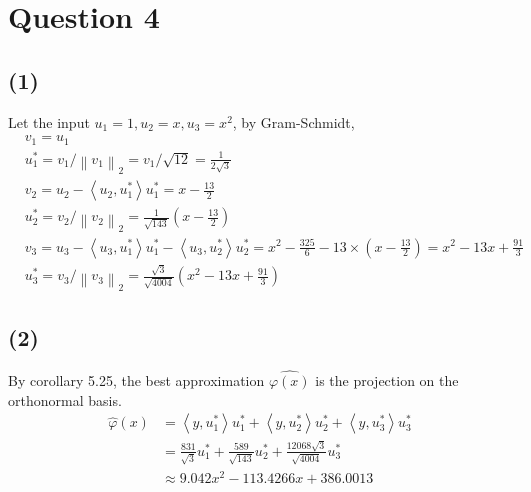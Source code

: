 \documentclass[11pt,a4paper]{article}
\theoremstyle{plain}
\begin{document}
\section*{Question 4}
\subsection*{(1)}
\noindent Let the input $u_1 = 1, u_2 = x, u_3 =x^2$, by Gram-Schmidt,
\begin{equation}
    \begin{aligned}
    & v_1=u_1\\
    & u_1^*=v_1 /\left\|v_1\right\|_2=v_1 / \sqrt{12}=\frac{1}{2 \sqrt{3}} \\
    & v_2=u_2-\left\langle u_2,u_1^*\right\rangle u_1^*=x-\frac{13}{2}\\
    & u_2^*=v_2 /\left\|v_2\right\|_2=\frac{1}{\sqrt{143}}\left(x-\frac{13}{2}\right) \\
    & v_3=u_3-\left\langle u_3, u_1^*\right\rangle u_1^*-\left\langle u_3, u_2^*\right\rangle u_2^*=x^2-\frac{325}{6}-13 \times\left(x-\frac{13}{2}\right)=x^2-13 x+\frac{91}{3} \\
    & u_3^*=v_3 /\left\|v_3\right\|_2=\frac{\sqrt{3}}{\sqrt{4004}}\left(x^2-13 x+\frac{91}{3}\right)
    \end{aligned}
\end{equation}

\subsection*{(2)}
\noindent By corollary 5.25, the best approximation $\hat{\varphi(x)}$ is the projection on the orthonormal basis.\\
\begin{equation}
    \begin{aligned}
    \hat{\varphi}(x) & =\left\langle y, u_1^*\right\rangle u_1^*+\left\langle y, u_2^*\right\rangle u_2^*+\left\langle y, u_3^*\right\rangle u_3^* \\
    & =\frac{831}{\sqrt{3}} u_1^*+\frac{589}{\sqrt{143}} u_2^*+\frac{12068 \sqrt{3}}{\sqrt{4004}} u_3^* \\
    & \approx 9.042 x^2-113.4266 x+386.0013
    \end{aligned}
\end{equation}
\end{document}

